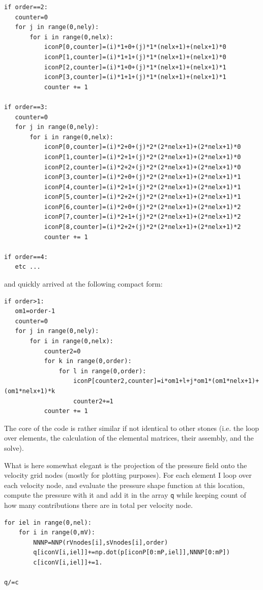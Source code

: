 \begin{lstlisting}
if order==2:
   counter=0
   for j in range(0,nely):
       for i in range(0,nelx):
           iconP[0,counter]=(i)*1+0+(j)*1*(nelx+1)+(nelx+1)*0 
           iconP[1,counter]=(i)*1+1+(j)*1*(nelx+1)+(nelx+1)*0 
           iconP[2,counter]=(i)*1+0+(j)*1*(nelx+1)+(nelx+1)*1 
           iconP[3,counter]=(i)*1+1+(j)*1*(nelx+1)+(nelx+1)*1 
           counter += 1

if order==3:
   counter=0
   for j in range(0,nely):
       for i in range(0,nelx):
           iconP[0,counter]=(i)*2+0+(j)*2*(2*nelx+1)+(2*nelx+1)*0 
           iconP[1,counter]=(i)*2+1+(j)*2*(2*nelx+1)+(2*nelx+1)*0 
           iconP[2,counter]=(i)*2+2+(j)*2*(2*nelx+1)+(2*nelx+1)*0 
           iconP[3,counter]=(i)*2+0+(j)*2*(2*nelx+1)+(2*nelx+1)*1 
           iconP[4,counter]=(i)*2+1+(j)*2*(2*nelx+1)+(2*nelx+1)*1 
           iconP[5,counter]=(i)*2+2+(j)*2*(2*nelx+1)+(2*nelx+1)*1 
           iconP[6,counter]=(i)*2+0+(j)*2*(2*nelx+1)+(2*nelx+1)*2 
           iconP[7,counter]=(i)*2+1+(j)*2*(2*nelx+1)+(2*nelx+1)*2 
           iconP[8,counter]=(i)*2+2+(j)*2*(2*nelx+1)+(2*nelx+1)*2 
           counter += 1

if order==4:
   etc ...
\end{lstlisting}
and quickly arrived at the following compact form:
\begin{lstlisting}
if order>1:
   om1=order-1
   counter=0
   for j in range(0,nely):
       for i in range(0,nelx):
           counter2=0
           for k in range(0,order):
               for l in range(0,order):
                   iconP[counter2,counter]=i*om1+l+j*om1*(om1*nelx+1)+(om1*nelx+1)*k 
                   counter2+=1
           counter += 1
\end{lstlisting}

The core of the code is rather similar if not identical to other stones (i.e.
the loop over elements, the calculation of the elemental matrices, their assembly, 
and the solve).

What is here somewhat elegant is the projection of the pressure field onto the 
velocity grid nodes (mostly for plotting purposes). 
For each element I loop over each velocity node, and evaluate the 
pressure shape function at this location, compute the pressure with it 
and add it in the array \lstinline{q} while keeping count of how many 
contributions there are in total per velocity node. 

\begin{lstlisting}
for iel in range(0,nel):
    for i in range(0,mV):
        NNNP=NNP(rVnodes[i],sVnodes[i],order)
        q[iconV[i,iel]]+=np.dot(p[iconP[0:mP,iel]],NNNP[0:mP])
        c[iconV[i,iel]]+=1.

q/=c
\end{lstlisting}


